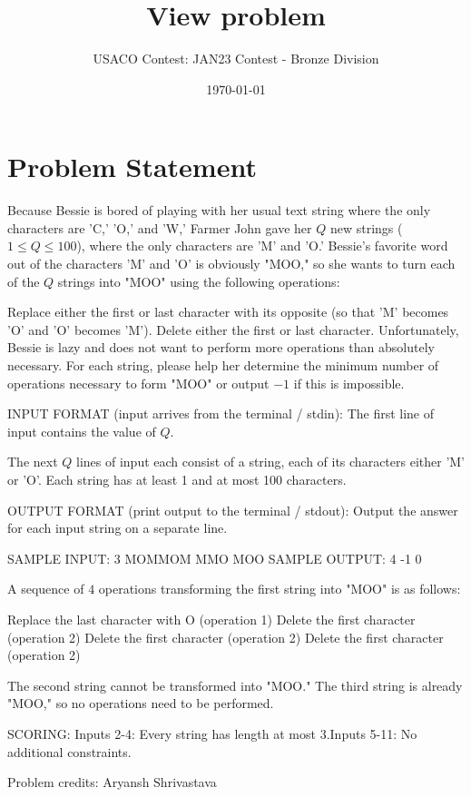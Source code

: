 \documentclass[12pt]{article}
\title{View problem}
\author{USACO Contest: JAN23 Contest - Bronze Division}
\date{\today}
\begin{document}
\maketitle

\section*{Problem Statement}


Because Bessie is bored of playing with her usual text string where the only
characters are 'C,' 'O,' and 'W,' Farmer John gave her $Q$ new strings
($1 \leq Q \leq 100$), where the only characters are 'M' and 'O.' Bessie's
favorite word out of the characters 'M' and 'O' is obviously "MOO," so she wants
to turn each of the $Q$ strings into "MOO" using the following operations:

Replace either the first or last character with its opposite (so that 'M'
becomes 'O' and 'O' becomes 'M'). Delete either the first or last character. 
Unfortunately, Bessie is lazy and does not want to perform more operations than
absolutely necessary. For each string, please help her determine the minimum
number of operations necessary to form "MOO" or output $-1$ if this is
impossible. 

INPUT FORMAT (input arrives from the terminal / stdin):
The first line of input contains the value of $Q$.

The next $Q$ lines of input each consist of a string, each of its characters
either 'M' or 'O'. Each string has at least 1 and at most 100 characters.

OUTPUT FORMAT (print output to the terminal / stdout):
Output the answer for each input string on a separate line.

SAMPLE INPUT:
3
MOMMOM
MMO
MOO
SAMPLE OUTPUT: 
4
-1
0

A sequence of $4$ operations transforming the first string into "MOO" is as
follows:


Replace the last character with O (operation 1)
Delete the first character (operation 2)
Delete the first character (operation 2)
Delete the first character (operation 2)

The second string cannot be transformed into "MOO." The third string is already
"MOO," so no operations need to be performed.

SCORING:
Inputs 2-4: Every string has length at most $3$.Inputs 5-11: No additional constraints.


Problem credits: Aryansh Shrivastava
\end{document}

